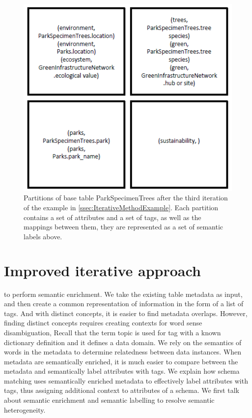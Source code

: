 \begin{figure}
    \centering
    \includegraphics[width=5in]{figures/partitions-park-specimen-trees.png}
    \caption{Partitions of base table ParkSpecimenTrees after the third iteration of the example in \autoref{ssec:IterativeMethodExample}. Each partition contains a set of attributes and a set of tags, as well as the mappings between them, they are represented as a set of semantic labels above.}
    \label{fig:partitions-park-specimen-trees}
\end{figure}

\section{Improved iterative approach}
\label{sec:ImprovedIterativeApproach}

to perform semantic enrichment. We take the existing table metadata as input, and then create a common representation of information in the form of a list of tags.
And with distinct concepts, it is easier to find metadata overlaps.
However, finding distinct concepts requires creating contexts for word sense disambiguation,
Recall that the term topic is used for tag with a known dictionary definition and it defines a data domain.
We rely on the semantics of words in the metadata to determine relatedness between data instances.
When metadata are semantically enriched, it is much easier to compare between the metadata and semantically label attributes with tags.
We explain how schema matching uses semantically enriched metadata to effectively label attributes with tags, thus assigning additional context to attributes of a schema.
We first talk about semantic enrichment and semantic labelling to resolve semantic heterogeneity.


